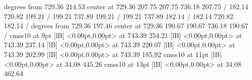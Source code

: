{ degrees from 729.36 214.53 center at 729.36 207.75
\setdashpattern <4pt, 4pt>
 207.75 736.18 207.75 /
\setsolid
{} 182.14 720.82 199.21 /
 199.21 737.89 199.21 /
 199.21 737.89 182.14 /
 182.14 720.82 182.14 /
 degrees from 729.36 197.46 center at 729.36 190.67
\setdashpattern <4pt, 4pt>
 190.67 736.18 190.67 /
\font\picfont cmss10 at 9pt\picfont
{}  [lB] <0.00pt,0.00pt> at 743.39 254.21
  [lB] <0.00pt,0.00pt> at 743.39 237.14
  [lB] <0.00pt,0.00pt> at 743.39 220.07
  [lB] <0.00pt,0.00pt> at 743.39 202.99
  [lB] <0.00pt,0.00pt> at 743.39 185.92
\font\picfont cmss10 at 11pt\picfont
{}  [lB] <0.00pt,0.00pt> at 34.08 445.26
\font\picfont cmss10 at 13pt\picfont
{}  [lB] <0.00pt,0.00pt> at 34.08 462.64
\endpicture
}
